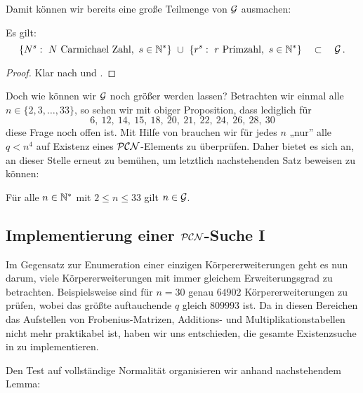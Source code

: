 Damit können wir bereits eine große Teilmenge von $\mathcal{G}$ ausmachen:

\begin{proposition}
  \label{prop:G}
  Es gilt:
  \[ \{ N^s:\ N\text{ Carmichael Zahl},\ s\in \N^\ast\} \ \cup\ 
    \{ r^s:\ r \text{ Primzahl},\ s\in \N^\ast\} \quad\subset\quad \G\,. \]
\end{proposition}
\begin{proof}
  Klar nach  und 
  .
\end{proof}

Doch wie können wir $\mathcal{G}$ noch größer werden lassen? 
Betrachten wir einmal alle $n\in \{ 2,3,\ldots,33\}$, so sehen wir mit
obiger Proposition, dass lediglich für 
\[ 6,\ 12,\ 14,\ 15,\ 18,\ 20,\ 21,\ 22,\ 24,\ 26,\ 28,\ 30\]
diese Frage noch offen ist.
Mit Hilfe von  brauchen wir für jedes $n$ 
„nur” alle $q < n^4$ auf Existenz eines $\mathcal{PCN}$-Elements zu überprüfen. Daher
bietet es sich an, an dieser Stelle erneut \sage zu bemühen, um letztlich
nachstehenden Satz beweisen zu können:

\begin{satz}
  \label{satz:hauptsatz_g}
  Für alle $n\in \mathbb{N}^\ast$ mit $2 \leq n \leq 33$ gilt
  $n \in \mathcal{G}$.
\end{satz}


\subsection{Implementierung einer $\mathcal{PCN}$-Suche I}

Im Gegensatz zur Enumeration einer einzigen Körpererweiterungen geht es nun
darum, viele Körpererweiterungen mit immer gleichem Erweiterungsgrad zu
betrachten. Beispielsweise sind für $n = 30$ genau
$64902$ Körpererweiterungen zu prüfen, wobei das größte auftauchende $q$
gleich $809993$ ist.
Da in diesen Bereichen das Aufstellen von Frobenius-Matrizen, Additions- und
Multiplikationstabellen nicht mehr praktikabel ist, haben wir uns entschieden,
die gesamte Existenzsuche in \sage zu implementieren.


Den Test auf vollständige Normalität organisieren wir anhand nachstehendem
Lemma: 

